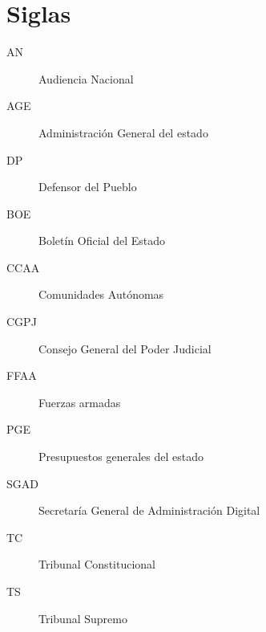 \section{Siglas}
\noindent
\begin{description}
    \item[AN] Audiencia Nacional
    \item[AGE] Administración General del estado
    \item[DP] Defensor del Pueblo 
    \item[BOE] Boletín Oficial del Estado
    \item[CCAA] Comunidades Autónomas
    \item[CGPJ] Consejo General del Poder Judicial
    \item[FFAA] Fuerzas armadas
    \item[PGE] Presupuestos generales del estado
    \item[SGAD] Secretaría General de Administración Digital 
    \item[TC] Tribunal Constitucional
    \item[TS] Tribunal Supremo
\end{description}
